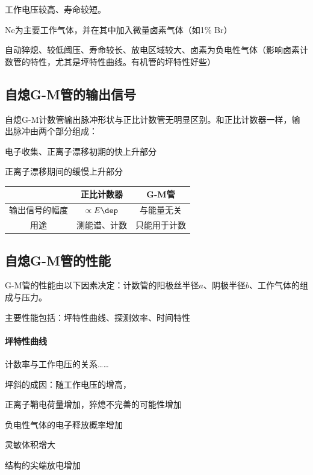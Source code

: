 工作电压较高、寿命较短。


Ne为主要工作气体，并在其中加入微量卤素气体（如1\% Br）

自动猝熄、较低阈压、寿命较长、放电区域较大、卤素为负电性气体（影响卤素计数管的特性，尤其是坪特性曲线。有机管的坪特性好些）

\subsection{自熄G-M管的输出信号}

自熄G-M计数管输出脉冲形状与正比计数管无明显区别。和正比计数器一样，输出脉冲由两个部分组成：
\begin{compactenum}
	\item 电子收集、正离子漂移初期的快上升部分
	\item 正离子漂移期间的缓慢上升部分
\end{compactenum}
\begin{center}
	\begin{tabular}{ccc}
		\toprule
		&正比计数器&G-M管\\
		\midrule
		输出信号的幅度&$\propto E\dep$&与能量无关\\
		用途&测能谱、计数&只能用于计数\\
		\bottomrule
	\end{tabular}
\end{center}

\subsection{自熄G-M管的性能}

G-M管的性能由以下因素决定：计数管的阳极丝半径$a$、阴极半径$b$、工作气体的组成与压力。

主要性能包括：坪特性曲线、探测效率、时间特性
\paragraph{坪特性曲线}计数率与工作电压的关系……

坪斜的成因：随工作电压的增高，
\begin{compactenum}
	\item 正离子鞘电荷量增加，猝熄不完善的可能性增加
	\item 负电性气体的电子释放概率增加
	\item 灵敏体积增大
	\item 结构的尖端放电增加
\end{compactenum}
